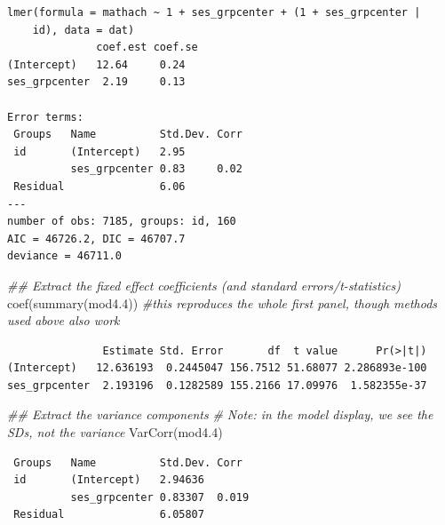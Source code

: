 \documentclass[
  letterpaper,
  DIV=11,
  numbers=noendperiod]{scrreprt}
\newenvironment{Shaded}{}{}
\newcommand{\CommentTok}[1]{\textcolor[rgb]{0.38,0.63,0.69}{\textit{#1}}}
\newcommand{\DecValTok}[1]{\textcolor[rgb]{0.25,0.63,0.44}{#1}}
\newcommand{\DocumentationTok}[1]{\textcolor[rgb]{0.73,0.13,0.13}{\textit{#1}}}
\newcommand{\FloatTok}[1]{\textcolor[rgb]{0.25,0.63,0.44}{#1}}
\newcommand{\FunctionTok}[1]{\textcolor[rgb]{0.02,0.16,0.49}{#1}}
\newcommand{\NormalTok}[1]{#1}
\newcommand{\SpecialCharTok}[1]{\textcolor[rgb]{0.25,0.44,0.63}{#1}}
\begin{document}
\begin{verbatim}
lmer(formula = mathach ~ 1 + ses_grpcenter + (1 + ses_grpcenter | 
    id), data = dat)
              coef.est coef.se
(Intercept)   12.64     0.24  
ses_grpcenter  2.19     0.13  

Error terms:
 Groups   Name          Std.Dev. Corr 
 id       (Intercept)   2.95          
          ses_grpcenter 0.83     0.02 
 Residual               6.06          
---
number of obs: 7185, groups: id, 160
AIC = 46726.2, DIC = 46707.7
deviance = 46711.0 
\end{verbatim}

\begin{Shaded}
\begin{Highlighting}[]
\DocumentationTok{\#\# Extract the fixed effect coefficients (and standard errors/t{-}statistics)}
\FunctionTok{coef}\NormalTok{(}\FunctionTok{summary}\NormalTok{(mod4}\FloatTok{.4}\NormalTok{)) }\CommentTok{\#this reproduces the whole first panel, though methods used above also work}
\end{Highlighting}
\end{Shaded}

\begin{verbatim}
               Estimate Std. Error       df  t value      Pr(>|t|)
(Intercept)   12.636193  0.2445047 156.7512 51.68077 2.286893e-100
ses_grpcenter  2.193196  0.1282589 155.2166 17.09976  1.582355e-37
\end{verbatim}

\begin{Shaded}
\begin{Highlighting}[]
\DocumentationTok{\#\# Extract the variance components}
\CommentTok{\# Note: in the model display, we see the SDs, not the variance}
\FunctionTok{VarCorr}\NormalTok{(mod4}\FloatTok{.4}\NormalTok{) }
\end{Highlighting}
\end{Shaded}

\begin{verbatim}
 Groups   Name          Std.Dev. Corr 
 id       (Intercept)   2.94636       
          ses_grpcenter 0.83307  0.019
 Residual               6.05807       
\end{verbatim}

\begin{Shaded}
\end{Shaded}
\end{document}
